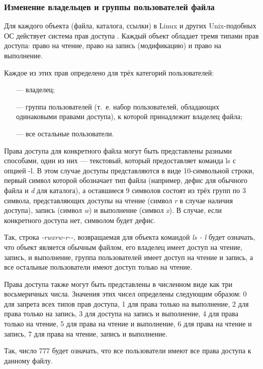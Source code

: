 \subsubsection{Изменение владельцев и группы пользователей файла}

Для каждого объекта (файла, каталога, ссылки) в Linux и других Unix-подобных ОС действует система прав доступа \cite{permission-definition}. Каждый объект обладает тремя типами прав доступа: право на чтение, право на запись (модификацию) и право на выполнение.

Каждое из этих прав определено для трёх категорий пользователей:
\begin{itemize}[leftmargin=1.6\parindent]
	\item[---] владелец;
	\item[---] группа пользователей (т.~е. набор пользователей, обладающих одинаковыми правами доступа), к которой принадлежит владелец файла;
	\item[---] все остальные пользователи.
\end{itemize}

Права доступа для конкретного файла могут быть представлены разными способами, один из них --- текстовый, который предоставляет команда ls с опцией -l. В этом случае доступы представляются в виде 10-символьной строки, первый символ которой обозначает тип файла (например, дефис для обычного файла и \textit{d} для каталога), а оставшиеся 9 символов состоят из трёх групп по 3 символа, представляющих доступы на чтение (символ \textit{r} в случае наличия доступа), запись (символ \textit{w}) и выполнение (символ \textit{x}). В случае, если конкретного доступа нет, символом будет дефис.

Так, строка \textit{-rwxrw-r-\--}, возвращаемая для объекта командой \textit{ls - l} будет означать, что объект является обычным файлом, его владелец имеет доступ на чтение, запись, и выполнение, группа пользователей имеет доступ на чтение и запись, а все остальные пользователи имеют доступ только на чтение.

Права доступа также могут быть представлены в численном виде как три восьмеричных числа. Значения этих чисел определены следующим образом: 0 для запрета всех типов прав доступа, 1 для права только на выполнение, 2 для права только на запись, 3 для доступа на запись и выполнение, 4 для права только на чтение, 5 для права на чтение и выполнение, 6 для права на чтение и запись, 7 для права на чтение, запись и выполнение.

Так, число 777 будет означать, что все пользователи имеют все права доступа к данному файлу.

